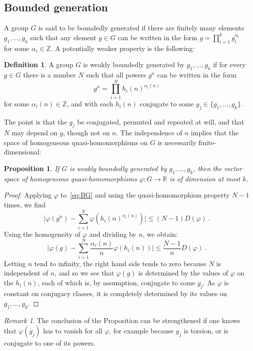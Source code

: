 \documentclass[12pt]{amsart}
\newtheorem{prop}[thm]{Proposition}
\theoremstyle{remark}
\newtheorem{rem}[thm]{Remark}
\theoremstyle{definition}
\newtheorem{defn}[thm]{Definition}
\newcommand{\R}{\mathbb{ R}}
\newcommand{\Z}{\mathbb{ Z}}
\begin{document}
\subsection{Bounded generation}\label{ss:bound}

A group $G$ is said to be boundedly generated if there are finitely 
many elements $g_{1},\ldots,g_{k}$ such that any element $g\in G$ can 
be written in the form 
$
g=\prod_{i=1}^{k}g_{i}^{\alpha_{i}}
$
for some $\alpha_{i}\in\Z$. A potentially weaker property is the 
following:
\begin{defn}
    A group $G$ is weakly boundedly generated by $g_{1},\ldots,g_{k}$ 
    if for every $g\in G$ there is a number $N$ such that all powers 
    $g^{n}$ can be written in the form 
\begin{equation}\label{eq:BG}
g^{n}=\prod_{i=1}^{N}h_{i}(n)^{\alpha_{i}(n)}
\end{equation}
for some $\alpha_{i}(n)\in\Z$, and with each $h_{i}(n)$ conjugate to 
some $g_{j}\in\{g_{1},\ldots,g_{k}\}$.
\end{defn}
The point is that the $g_{j}$ be conjugated, permuted and repeated at 
will, and that $N$ may depend on $g$, though not on $n$. The 
independence of $n$ implies that the space of homogeneous 
quasi-homomorphisms on $G$ is necessarily finite-dimensional:
\begin{prop}\label{p:BG}
    If $G$ is weakly boundedly generated by $g_{1},\ldots,g_{k}$, then 
    the vector space of homogeneous quasi-homomorphisms $\varphi\colon 
    G\rightarrow\R$ is of dimension at most $k$.
    \end{prop}
\begin{proof}
    Applying $\varphi$ to~\eqref{eq:BG} and using the 
    quasi-homomorphism property $N-1$ times, we find
    $$
    \vert\varphi(g^{n})-
    \sum_{i=1}^{N}\varphi(h_{i}(n)^{\alpha_{i}(n)})\vert\leq 
    (N-1)D(\varphi) \ .
    $$
    Using the homogeneity of $\varphi$ and dividing by $n$, we obtain:
    $$
    \vert\varphi(g)-
    \sum_{i=1}^{N}\frac{\alpha_{i}(n)}{n}\varphi(h_{i}(n))\vert\leq 
    \frac{N-1}{n}D(\varphi) \ .
    $$
    Letting $n$ tend to infinity, the right hand side tends to zero 
    because $N$ is independent of $n$, and so we see that $\varphi(g)$ 
    is determined by the values of $\varphi$ on the $h_{i}(n)$, each 
    of which is, by assumption, conjugate to some $g_{j}$. As $\varphi$ is 
    constant on conjugacy classes, it is completely determined 
    by its values on $g_{1},\ldots,g_{k}$.
    \end{proof}
\begin{rem}
    The conclusion of the Proposition can be strengthened if one knows 
    that $\varphi(g_{j})$ has to vanish for all $\varphi$, for example 
    because $g_{j}$ is torsion, or is conjugate to one of its powers. 
    \end{rem}
    
\end{document}
